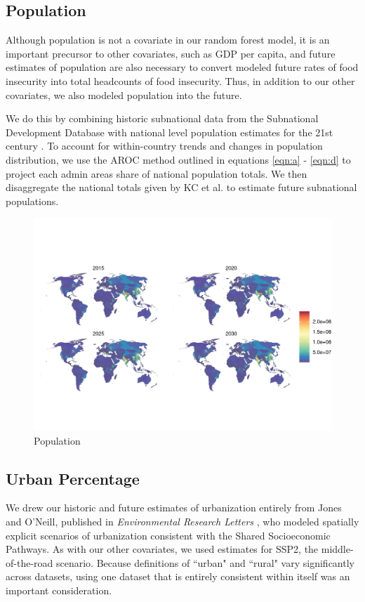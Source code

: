 \documentclass{article}
\begin{document}
\subsection{Population}
Although population is not a covariate in our random forest model, it is an important precursor to other covariates, such as GDP per capita, and future estimates of population are also necessary to convert modeled future rates of food insecurity into total headcounts of food insecurity.  Thus, in addition to our other covariates, we also modeled population into the future.

We do this by combining historic subnational data from the Subnational Development Database \citep{Smits2019} with national level population estimates for the 21st century \citep{KC2017}.  To account for within-country trends and changes in population distribution, we use the AROC method outlined in equations \ref{eqn:a} - \ref{eqn:d} to project each admin areas share of national population totals. We then disaggregate the national totals given by KC et al. to estimate future subnational populations.

\begin{figure}[H]
  \centering
  \includegraphics[width=\linewidth]{img/covars/population.png}
  \caption{Population}
\end{figure}

\subsection{Urban Percentage}

We drew our historic and future estimates of urbanization entirely from Jones and O'Neill, published in \textit{Environmental Research Letters} \citep{Jones2016}, who modeled spatially explicit scenarios of urbanization consistent with the Shared Socioeconomic Pathways.  As with our other covariates, we used estimates for SSP2, the middle-of-the-road scenario.  Because definitions of ``urban" and ``rural" vary significantly across datasets, using one dataset that is entirely consistent within itself was an important consideration.
\end{document}
